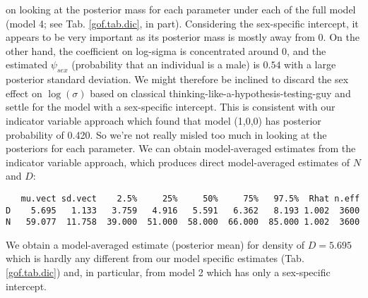 on looking at the posterior mass for each parameter under each of the
full model (model 4; see Tab. \ref{gof.tab.dic}, in part). Considering
the sex-specific intercept, it appears to be very important as its
posterior mass is mostly away from 0.  On the other hand, the
coefficient on log-sigma is concentrated around 0, and the estimated
$\psi_{sex}$ (probability that an individual is a male) is $0.54$ with
a large posterior standard deviation.  We might therefore be inclined
to discard the sex effect on $\log(\sigma)$ based on classical
thinking-like-a-hypothesis-testing-guy and settle for the model with a
sex-specific intercept. This is consistent with our indicator variable
approach which found that model (1,0,0) has posterior probability of
0.420. So we're not really misled too much in looking at the
posteriors for each parameter.  We can obtain model-averaged estimates
from the indicator variable approach, which produces direct
model-averaged estimates of $N$ and $D$:
{\small
\begin{verbatim}
   mu.vect sd.vect    2.5%     25%     50%     75%   97.5%  Rhat n.eff
D    5.695   1.133   3.759   4.916   5.591   6.362   8.193 1.002  3600
N   59.077  11.758  39.000  51.000  58.000  66.000  85.000 1.002  3600
\end{verbatim}
}
We obtain a model-averaged estimate (posterior mean) for density of $D=5.695$
which is hardly any different from our
model specific estimates (Tab. \ref{gof.tab.dic}) and, in particular, from model 2
which has only a sex-specific intercept.



\begin{comment}
XXXX MIGHT BE GOOD TO HAVE THIS BUT OPTIONAL XXXXXXXXXXX
\subsection{Sensitivity to Prior Distributions}

{\bf XXXXXXXXXXX TO BE DONE XXXXXXXXXX}

Discussion of sensitivity to prior ......
Results of DIC and model indicator variable analyses were based on
unif(-3,3) priors for the parameters. This keeps them in the ballpark
when they are not in the model. We tried a different prior:
normal(0,.1) which you can do just by editing the function
 \mbox{\tt wolvSCR0ms}.
Doing the DIC analysis changes the result to XXXXXXXXXXXXX

The indicator variable analysis was rerun and that produces XXXXXXXXXXXXXXX
We modified
 the {\bf R} script to run the same model
but with \mbox{\tt dnorm(0,.1)} prior distributions, producing the
following results:  {\bf XXXXX RERUN THIS XXXXXXX}
\begin{verbatim}
> mod<-toad5$BUGSoutput$sims.list$mod
> mod<-paste(mod[,1],mod[,2])
> table(mod)/length(mod)

mod
       0 0        0 1        1 0        1 1
0.43945000 0.02185000 0.50708333 0.03161667
\end{verbatim}
\end{comment}

